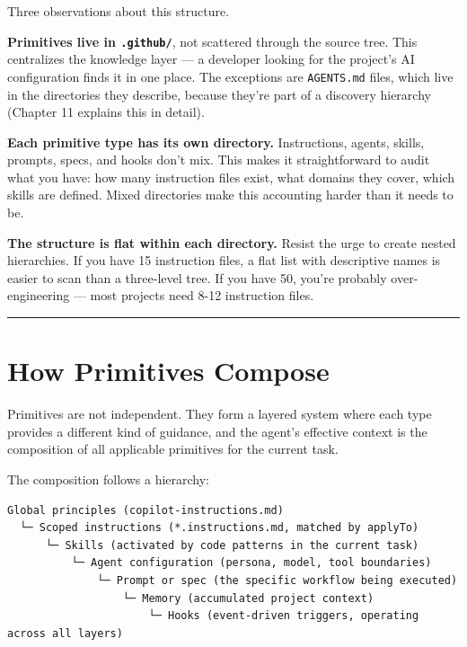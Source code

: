 \documentclass[
  a4paper,
  DIV=11,
  numbers=noendperiod]{scrreprt}
\begin{document}
Three observations about this structure.

\textbf{Primitives live in \texttt{.github/}}, not scattered through the
source tree. This centralizes the knowledge layer --- a developer
looking for the project's AI configuration finds it in one place. The
exceptions are \texttt{AGENTS.md} files, which live in the directories
they describe, because they're part of a discovery hierarchy (Chapter 11
explains this in detail).

\textbf{Each primitive type has its own directory.} Instructions,
agents, skills, prompts, specs, and hooks don't mix. This makes it
straightforward to audit what you have: how many instruction files
exist, what domains they cover, which skills are defined. Mixed
directories make this accounting harder than it needs to be.

\textbf{The structure is flat within each directory.} Resist the urge to
create nested hierarchies. If you have 15 instruction files, a flat list
with descriptive names is easier to scan than a three-level tree. If you
have 50, you're probably over-engineering --- most projects need 8-12
instruction files.

\begin{center}\rule{0.5\linewidth}{0.5pt}\end{center}

\section{How Primitives Compose}\label{how-primitives-compose}

Primitives are not independent. They form a layered system where each
type provides a different kind of guidance, and the agent's effective
context is the composition of all applicable primitives for the current
task.

The composition follows a hierarchy:

\begin{verbatim}
Global principles (copilot-instructions.md)
  └─ Scoped instructions (*.instructions.md, matched by applyTo)
      └─ Skills (activated by code patterns in the current task)
          └─ Agent configuration (persona, model, tool boundaries)
              └─ Prompt or spec (the specific workflow being executed)
                  └─ Memory (accumulated project context)
                      └─ Hooks (event-driven triggers, operating across all layers)
\end{verbatim}
\end{document}
